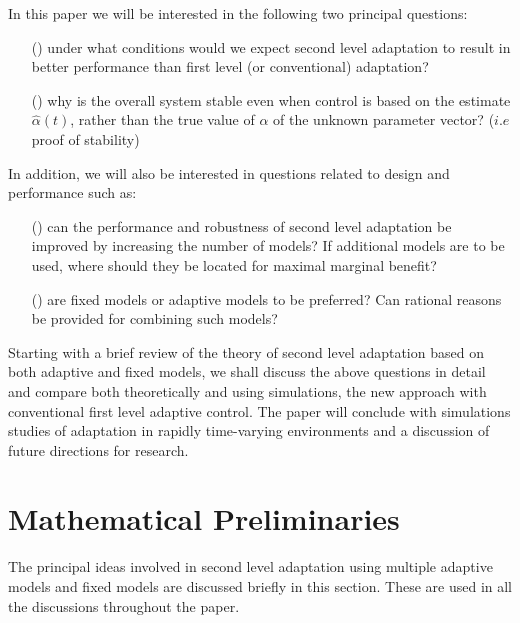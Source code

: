 \documentclass[conference]{IEEEtran}
\begin{document}
In this paper we will be interested in the following two principal questions:
\begin{enumerate}
\item[(\expandafter{\romannumeral1})] under what conditions would we expect second level adaptation to result in better performance than first level (or conventional) adaptation?
\item[(\expandafter{\romannumeral2})] why is the overall system stable even when control is based on the estimate $\hat{\alpha}(t)$, rather than the true value of $\alpha$  of the unknown parameter vector? ($i.e$ proof of stability)
\end{enumerate}

In addition, we will also be interested in questions related to design and performance such as:
\begin{enumerate}
\item[(\expandafter{\romannumeral3})] can the performance and robustness of second level adaptation be improved by increasing the number of models? If additional models are to be used, where should they be located for maximal marginal benefit?
\item[(\expandafter{\romannumeral4})] are fixed models or adaptive models to be preferred? Can rational reasons be provided for combining such models?
\end{enumerate}


Starting with a brief review of the theory of second level adaptation based on both adaptive and fixed models, we shall discuss the above questions in detail and  compare both theoretically and using simulations, the new approach with conventional first level adaptive control. The paper will conclude with simulations studies of adaptation in rapidly time-varying environments and a discussion of future directions for research.



\section{Mathematical Preliminaries}
The principal ideas involved in second level adaptation using multiple adaptive models and fixed models are discussed briefly in this section. These are used in all the discussions throughout the paper.
\end{document}
